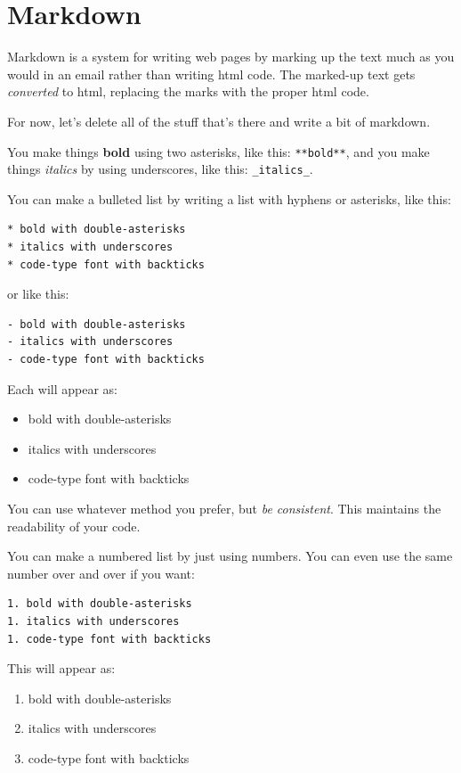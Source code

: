 \documentclass[]{book}
\providecommand{\tightlist}{%
  \setlength{\itemsep}{0pt}\setlength{\parskip}{0pt}}
\begin{document}
\section{Markdown}\label{markdown}

Markdown is a system for writing web pages by marking up the text much
as you would in an email rather than writing html code. The marked-up
text gets \emph{converted} to html, replacing the marks with the proper
html code.

For now, let's delete all of the stuff that's there and write a bit of
markdown.

You make things \textbf{bold} using two asterisks, like this:
\texttt{**bold**}, and you make things \emph{italics} by using
underscores, like this: \texttt{\_italics\_}.

You can make a bulleted list by writing a list with hyphens or
asterisks, like this:

\begin{verbatim}
* bold with double-asterisks
* italics with underscores
* code-type font with backticks
\end{verbatim}

or like this:

\begin{verbatim}
- bold with double-asterisks
- italics with underscores
- code-type font with backticks
\end{verbatim}

Each will appear as:

\begin{itemize}
\tightlist
\item
  bold with double-asterisks
\item
  italics with underscores
\item
  code-type font with backticks
\end{itemize}

You can use whatever method you prefer, but \emph{be consistent}. This
maintains the readability of your code.

You can make a numbered list by just using numbers. You can even use the
same number over and over if you want:

\begin{verbatim}
1. bold with double-asterisks
1. italics with underscores
1. code-type font with backticks
\end{verbatim}

This will appear as:

\begin{enumerate}
\def\labelenumi{\arabic{enumi}.}
\tightlist
\item
  bold with double-asterisks
\item
  italics with underscores
\item
  code-type font with backticks
\end{enumerate}
\end{document}
